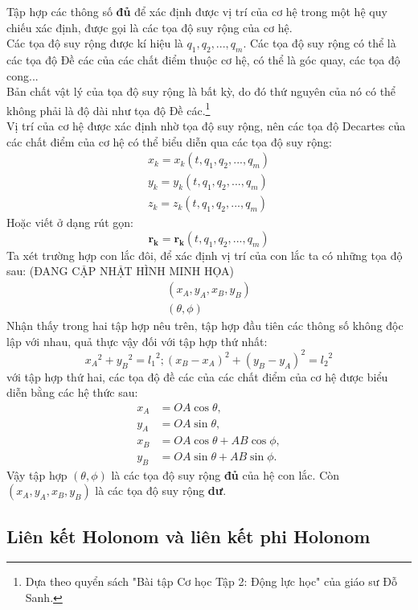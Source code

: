 Tập hợp các thông số \textbf{đủ} để xác định được vị trí của cơ hệ trong một hệ quy chiếu xác định, được gọi là các tọa độ suy rộng của cơ hệ.\\
Các tọa độ suy rộng được kí hiệu là $q_1, q_2, ..., q_m$. Các tọa độ suy rộng có thể là các tọa độ Đề các của các chất điểm thuộc cơ hệ, có thể là góc quay, các tọa độ cong...\\
Bản chất vật lý của tọa độ suy rộng là bất kỳ, do đó thứ nguyên của nó có thể không phải là độ dài như tọa độ Đề các.\footnote{Dựa theo quyển sách "Bài tập Cơ học Tập 2: Động lực học" của giáo sư Đỗ Sanh.}\\
Vị trí của cơ hệ được xác định nhờ tọa độ suy rộng, nên các tọa độ Decartes của các chất điểm của cơ hệ có thể biểu diễn qua các tọa độ suy rộng:
\begin{align*}
    x_k = x_k(t, q_1, q_2, ..., q_m)\\
    y_k = y_k(t, q_1, q_2, ..., q_m)\\
    z_k = z_k(t, q_1, q_2, ..., q_m)
\end{align*}
Hoặc viết ở dạng rút gọn:
\begin{equation*}
    \mathbf{r_k} = \mathbf{r_k}(t, q_1, q_2, ..., q_m)
\end{equation*}
Ta xét trường hợp con lắc đôi, để xác định vị trí của con lắc ta có những tọa độ sau: (ĐANG CẬP NHẬT HÌNH MINH HỌA)
\begin{align*}
    (x_A, y_A, x_B, y_B)\\
    (\theta, \phi)
\end{align*}
Nhận thấy trong hai tập hợp nêu trên, tập hợp đầu tiên các thông số không độc lập với nhau, quả thực vậy đối với tập hợp thứ nhất:
\begin{equation*}
    {x_A}^2+{y_B}^2 = {l_1}^2; {(x_B - x_A)}^2+{(y_B - y_A)}^2 = {l_2}^2
\end{equation*}
với tập hợp thứ hai, các tọa độ đề các của các chất điểm của cơ hệ được biểu diễn bằng các hệ thức sau:
\begin{align*}
    x_A &= OA\cos{\theta}, \\
    y_A &= OA\sin{\theta}, \\
    x_B &= OA\cos{\theta} + AB\cos{\phi}, \\
    y_B &= OA\sin{\theta} + AB\sin{\phi}.
\end{align*}
Vậy tập hợp $(\theta, \phi)$ là các tọa độ suy rộng \textbf{đủ} của hệ con lắc. Còn $(x_A, y_A, x_B, y_B)$ là các tọa độ suy rộng \textbf{dư}.

\subsection{Liên kết Holonom và liên kết phi Holonom}

